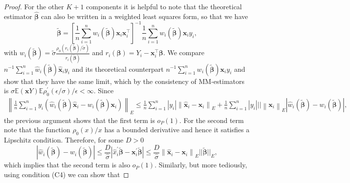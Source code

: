 \documentclass[11pt]{article}
\begin{document}
\begin{proof}
For the other $K+1$ components it is helpful to note that the theoretical estimator $\boldsymbol{\widehat{\beta}}$ can also be written in a weighted least squares form, so that we have
\begin{equation*}
\boldsymbol{\widetilde{\beta}} = \left[ \frac{1}{n} \sum_{i=1}^n  w_i ( \boldsymbol{\widetilde{\beta}} ) \mathbf{x}_i \mathbf{x}_i^{\top} \right]^{-1} \frac{1}{n} \sum_{i=1}^n w_i ( \boldsymbol{\widetilde{\beta}}) \mathbf{x}_i y_i,
\end{equation*}
with $w_i ( \boldsymbol{\widetilde{\beta}} ) = \widetilde{\sigma}\frac{ \rho_0 \left( r_i \left( \widetilde{\boldsymbol{\beta}} \right)/\widetilde{\sigma} \right) }{ r_i \left( \widetilde{\boldsymbol{\beta}} \right)}$ and $r_i(\boldsymbol{\beta}) = Y_i - \mathbf{x}^{\top}_i \boldsymbol{\beta}$. We compare $n^{-1}\sum_{i=1}^n \widehat{w}_i ( \boldsymbol{\widetilde{\beta}}) \widehat{\mathbf{x}}_i y_i$ and its theoretical counterpart $n^{-1} \sum_{i=1}^n w_i ( \boldsymbol{\widetilde{\beta}}) \mathbf{x}_i y_i $ and show that they  have the same limit, which by the consistency of MM-estimators is $ \sigma \mathbb{E}(\mathbf{x}Y) \mathbb{E}\rho_{0}^{\prime}(\epsilon/\sigma)/\epsilon<\infty$. Since
\begin{align*}
\left\| \frac{1}{n} \sum_{i=1}^n y_i \left(\widehat{w}_i ( \boldsymbol{\widetilde{\beta}}) \mathbf{\widehat{x}}_i - w_i ( \boldsymbol{\widetilde{\beta}}) \mathbf{x}_i  \right) \right\|_{E} 
\leq \frac{1}{n} \sum_{i=1}^n \left|y_i \right| \left\| \mathbf{\widehat{x}}_i - \mathbf{x}_i \right\|_{E} + \frac{1}{n} \sum_{i=1}^n \left| y_i \right| \left|  \right| \left\| \mathbf{x}_i \right\|_{E} \left| \widehat{w}_i ( \boldsymbol{\widetilde{\beta}}) - w_i ( \boldsymbol{\widetilde{\beta}}) \right|,
\end{align*}
the previous argument shows that the first term is $o_{P}(1)$. For the second term note that the function $\rho_0(x)/x$ has a bounded derivative and hence it satisfies a Lipschitz condition. Therefore, for some $D>0$
\begin{equation}
\left| \widehat{w}_i ( \boldsymbol{\widetilde{\beta}}) - w_i ( \boldsymbol{\widetilde{\beta}}) \right| \leq \frac{D}{\widehat{\sigma}} \left| \widehat{x}_{i}^{\prime}\boldsymbol{\widetilde{\beta}} -\mathbf{x}_i ^{\prime} \boldsymbol{\widetilde{\beta}} \right| \leq \frac{D}{\widehat{\sigma}}  \left\| \mathbf{\widehat{x}}_i - \mathbf{x}_i \right\|_{E} || \boldsymbol{ \widetilde{\beta}} ||_{E},
\end{equation}
which implies that the second term is also $o_{P}(1)$. Similarly, but more tediously, using condition (C4) we can show that

\end{proof}
\end{document}
